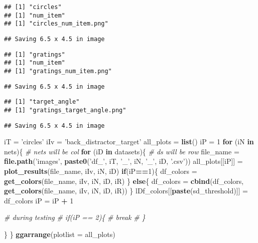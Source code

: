 \documentclass[]{article}
\newenvironment{Shaded}{\begin{snugshade}}{\end{snugshade}}
\newcommand{\KeywordTok}[1]{\textcolor[rgb]{0.13,0.29,0.53}{\textbf{#1}}}
\newcommand{\DataTypeTok}[1]{\textcolor[rgb]{0.13,0.29,0.53}{#1}}
\newcommand{\DecValTok}[1]{\textcolor[rgb]{0.00,0.00,0.81}{#1}}
\newcommand{\StringTok}[1]{\textcolor[rgb]{0.31,0.60,0.02}{#1}}
\newcommand{\CommentTok}[1]{\textcolor[rgb]{0.56,0.35,0.01}{\textit{#1}}}
\newcommand{\ControlFlowTok}[1]{\textcolor[rgb]{0.13,0.29,0.53}{\textbf{#1}}}
\newcommand{\OperatorTok}[1]{\textcolor[rgb]{0.81,0.36,0.00}{\textbf{#1}}}
\newcommand{\NormalTok}[1]{#1}
\begin{document}
\begin{verbatim}
## [1] "circles"
## [1] "num_item"
## [1] "circles_num_item.png"
\end{verbatim}

\begin{verbatim}
## Saving 6.5 x 4.5 in image
\end{verbatim}

\begin{verbatim}
## [1] "gratings"
## [1] "num_item"
## [1] "gratings_num_item.png"
\end{verbatim}

\begin{verbatim}
## Saving 6.5 x 4.5 in image
\end{verbatim}

\begin{verbatim}
## [1] "target_angle"
## [1] "gratings_target_angle.png"
\end{verbatim}

\begin{verbatim}
## Saving 6.5 x 4.5 in image
\end{verbatim}

\begin{Shaded}
\begin{Highlighting}[]
\NormalTok{iT =}\StringTok{ 'circles'}
\NormalTok{iIv =}\StringTok{ 'back_distractor_target'}
\NormalTok{all_plots =}\StringTok{ }\KeywordTok{list}\NormalTok{()}
\NormalTok{iP =}\StringTok{ }\DecValTok{1}
\ControlFlowTok{for}\NormalTok{ (iN }\ControlFlowTok{in}\NormalTok{ nets)\{ }\CommentTok{# nets will be col}
  \ControlFlowTok{for}\NormalTok{ (iD }\ControlFlowTok{in}\NormalTok{ datasets)\{ }\CommentTok{# ds will be row}
\NormalTok{    file_name =}\StringTok{ }\KeywordTok{file.path}\NormalTok{(}\StringTok{'images'}\NormalTok{, }\KeywordTok{paste0}\NormalTok{(}\StringTok{'df_'}\NormalTok{, iT, }\StringTok{'_'}\NormalTok{, iN, }\StringTok{'_'}\NormalTok{, iD, }\StringTok{'.csv'}\NormalTok{))}
\NormalTok{    all_plots[[iP]] =}\StringTok{ }\KeywordTok{plot_results}\NormalTok{(file_name, iIv, iN, iD)}
      \ControlFlowTok{if}\NormalTok{(iP}\OperatorTok{==}\DecValTok{1}\NormalTok{)\{}
\NormalTok{        df_colors =}\StringTok{ }\KeywordTok{get_colors}\NormalTok{(file_name, iIv, iN, iD, iR)}
\NormalTok{      \} }\ControlFlowTok{else}\NormalTok{\{}
\NormalTok{        df_colors =}\StringTok{ }\KeywordTok{cbind}\NormalTok{(df_colors, }\KeywordTok{get_colors}\NormalTok{(file_name, iIv, iN, iD, iR))}
\NormalTok{      \}}
\NormalTok{      lDf_colors[[}\KeywordTok{paste}\NormalTok{(sd_threshold)]] =}\StringTok{ }\NormalTok{df_colors}
\NormalTok{      iP =}\StringTok{ }\NormalTok{iP }\OperatorTok{+}\StringTok{ }\DecValTok{1}

    \CommentTok{# during testing}
    \CommentTok{# if(iP == 2)\{}
    \CommentTok{#   break}
    \CommentTok{# \}}
      
\NormalTok{  \}}
\NormalTok{\}}
\KeywordTok{ggarrange}\NormalTok{(}\DataTypeTok{plotlist =}\NormalTok{ all_plots)}
\end{Highlighting}
\end{Shaded}
\end{document}
